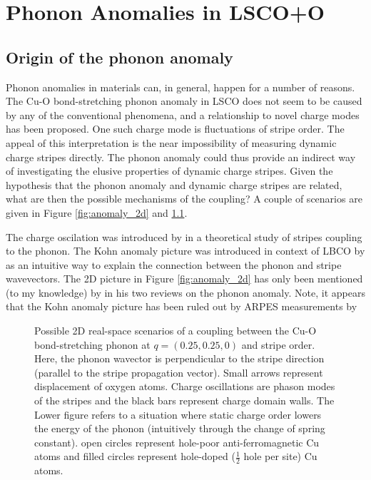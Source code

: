 \chapter{Phonon Anomalies in LSCO+O}\label{ch:anomaly}

\section{Origin of the phonon anomaly}
Phonon anomalies in materials can, in general, happen for a number of reasons. The Cu-O bond-stretching phonon anomaly in LSCO does not seem to be caused by any of the conventional phenomena, and a relationship to novel charge modes has been proposed. One such charge mode is fluctuations of stripe order. The appeal of this interpretation is the near impossibility of measuring dynamic charge stripes directly. The phonon anomaly could thus provide an indirect way of investigating the elusive properties of dynamic charge stripes. Given the hypothesis that the phonon anomaly and dynamic charge stripes are related, what are then the possible mechanisms of the coupling? A couple of scenarios are given in Figure \ref{fig:anomaly_2d} and \ref{fig:anomaly_1d}.

The charge oscilation was introduced by \citeauthor{Kaneshita2002}\cite{Kaneshita2002} in a theoretical study of stripes coupling to the phonon. The Kohn anomaly picture was introduced in context of LBCO by \citeauthor{Reznik2006}\cite{Reznik2006} as an intuitive way to explain the connection between the phonon and stripe wavevectors. The 2D picture in Figure \ref{fig:anomaly_2d} has only been mentioned (to my knowledge) by \citeauthor{Reznik2010} in his two reviews on the phonon anomaly\cite{Reznik2010, Reznik2012}. Note, it appears that the Kohn anomaly picture has been ruled out by ARPES measurements by \citeauthor{Park2014}\cite{Park2014}

\begin{figure}
    \centering
    
    \caption[2D phonon anomaly sketch]{Possible 2D real-space scenarios of a coupling between the Cu-O bond-stretching phonon at $q=(0.25,0.25,0)$ and stripe order. Here, the phonon wavector is perpendicular to the stripe direction (parallel to the stripe propagation vector). Small arrows represent displacement of oxygen atoms. Charge oscillations are phason modes of the stripes and the black bars represent charge domain walls. The Lower figure refers to a situation where static charge order lowers the energy of the phonon (intuitively through the change of spring constant). open circles represent hole-poor anti-ferromagnetic Cu atoms and filled circles represent hole-doped ($\frac{1}{2}$ hole per site) Cu atoms.}
    \label{fig:anomaly_1d}
\end{figure}

